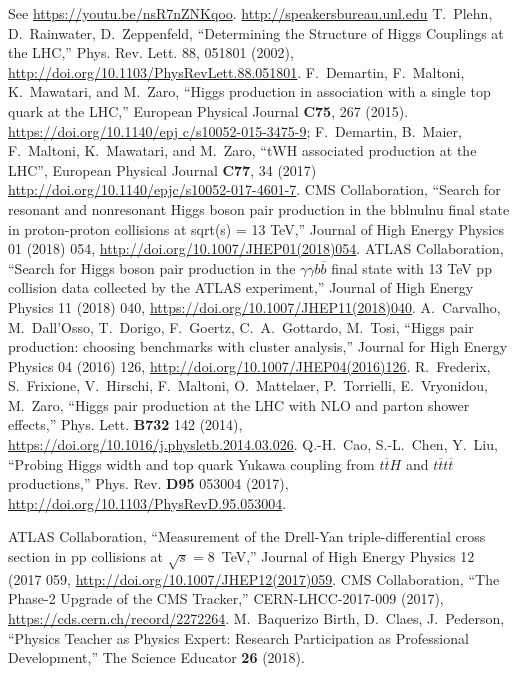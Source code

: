 \begin{thebibliography}{99}
%
 See \url{https://youtu.be/nsR7nZNKqoo}.
%
 \url{http://speakersbureau.unl.edu}
%
    T.~Plehn, D.~Rainwater, D.~Zeppenfeld, ``Determining the Structure of Higgs Couplings at the LHC,''
    Phys. Rev. Lett. 88, 051801 (2002), \url{http://doi.org/10.1103/PhysRevLett.88.051801}.
%
 F.~Demartin, F.~Maltoni, K.~Mawatari, and M.~Zaro,
  ``Higgs production in association with a single top quark at the LHC,''
  European Physical Journal {\bf C75}, 267
  (2015). \url{https://doi.org/10.1140/epj c/s10052-015-3475-9};
  F.~Demartin, B.~Maier, F.~Maltoni, K.~Mawatari, and M.~Zaro, ``tWH
  associated production at the LHC'', European Physical Journal {\bf C77}, 34 (2017)
  \url{http://doi.org/10.1140/epjc/s10052-017-4601-7}. 
%
%
    CMS Collaboration, ``Search for resonant and nonresonant Higgs boson pair production in the bblnulnu final state in proton-proton collisions at sqrt(s) = 13 TeV,'' 
    Journal of High Energy Physics 01 (2018) 054, \url{http://doi.org/10.1007/JHEP01(2018)054}.
%
    ATLAS Collaboration, ``Search for Higgs boson pair production in the $\gamma\gamma b\overline{b}$ final state with 13 TeV pp collision data collected by the ATLAS experiment,''
    Journal of High Energy Physics 11 (2018) 040, \url{https://doi.org/10.1007/JHEP11(2018)040}.
%
    A.~Carvalho, M.~Dall’Osso, T.~Dorigo, F.~Goertz, C.~A.~Gottardo, M.~Tosi,
    ``Higgs pair production: choosing benchmarks with cluster analysis,''
    Journal for High Energy Physics 04 (2016) 126, \url{http://doi.org/10.1007/JHEP04(2016)126}.
%
%
%
 R.~Frederix, S.~Frixione, V.~Hirschi,
  F.~Maltoni, O.~Mattelaer, P.~Torrielli, E.~Vryonidou, M.~Zaro, ``Higgs
  pair production at the LHC with NLO and parton shower effects,''
  Phys. Lett. {\bf B732} 142 (2014), \url{ https://doi.org/10.1016/j.physletb.2014.03.026}.
    Q.-H.~Cao, S.-L.~Chen, Y.~Liu,
    ``Probing Higgs width and top quark Yukawa coupling from $t\overline{t}H$ and $t\overline{t}t\overline{t}$ productions,''
    Phys. Rev. {\bf D95} 053004 (2017), \url{http://doi.org/10.1103/PhysRevD.95.053004}.

%
    ATLAS Collaboration, ``Measurement of the Drell-Yan triple-differential cross section in pp collisions at $\sqrt{s}=$8~TeV,''
    Journal of High Energy Physics 12 (2017 059, \url{http://doi.org/10.1007/JHEP12(2017)059}.
%
CMS Collaboration, ``The Phase-2 Upgrade of the CMS Tracker,'' CERN-LHCC-2017-009 (2017),
\url{https://cds.cern.ch/record/2272264}.
%
 M.~Baquerizo Birth, D.~Claes, J.~Pederson, ``Physics Teacher as Physics Expert: Research Participation as Professional Development,''  The Science Educator {\bf 26} (2018).
\end{thebibliography}
